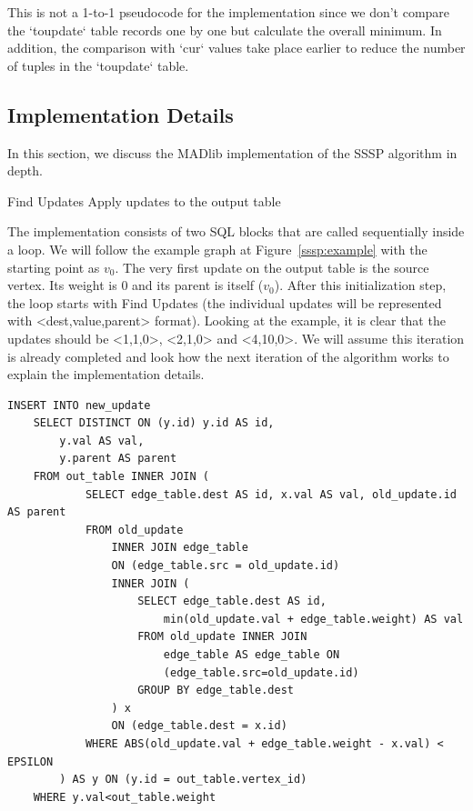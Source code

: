 This is not a 1-to-1 pseudocode for the implementation since we don't compare
the `toupdate` table records one by one but calculate the overall minimum. In
addition, the comparison with `cur` values take place earlier to reduce the
number of tuples in the `toupdate` table.

\subsection{Implementation Details}

In this section, we discuss the MADlib implementation of the SSSP algorithm
in depth.

\begin{algorithm} \label{alg:sssp:high}
\begin{algorithmic}[1]
	\Repeat
		\State Find Updates
		\State Apply updates to the output table
\end{algorithmic}
\end{algorithm}

The implementation consists of two SQL blocks that are called sequentially
inside a loop. We will follow the example graph at Figure~\ref{sssp:example}
with the starting point as $v_0$. The very first update on the output table is
the source vertex. Its weight is $0$ and its parent is itself ($v_0$). After
this initialization step, the loop starts with Find Updates (the individual
updates will be represented with <dest,value,parent> format). Looking at the
example, it is clear that the updates should be <1,1,0>, <2,1,0> and <4,10,0>.
We will assume this iteration is already completed and look how the next
iteration of the algorithm works to explain the implementation details.

\begin{algorithm}
\label{alg:sssp:findu}
\begin{lstlisting}
INSERT INTO new_update
	SELECT DISTINCT ON (y.id) y.id AS id,
		y.val AS val,
		y.parent AS parent
	FROM out_table INNER JOIN (
			SELECT edge_table.dest AS id, x.val AS val, old_update.id AS parent
			FROM old_update
				INNER JOIN edge_table
				ON (edge_table.src = old_update.id)
				INNER JOIN (
					SELECT edge_table.dest AS id,
						min(old_update.val + edge_table.weight) AS val
					FROM old_update INNER JOIN
						edge_table AS edge_table ON
						(edge_table.src=old_update.id)
					GROUP BY edge_table.dest
				) x
				ON (edge_table.dest = x.id)
			WHERE ABS(old_update.val + edge_table.weight - x.val) < EPSILON
		) AS y ON (y.id = out_table.vertex_id)
	WHERE y.val<out_table.weight
\end{lstlisting}
\end{algorithm}

